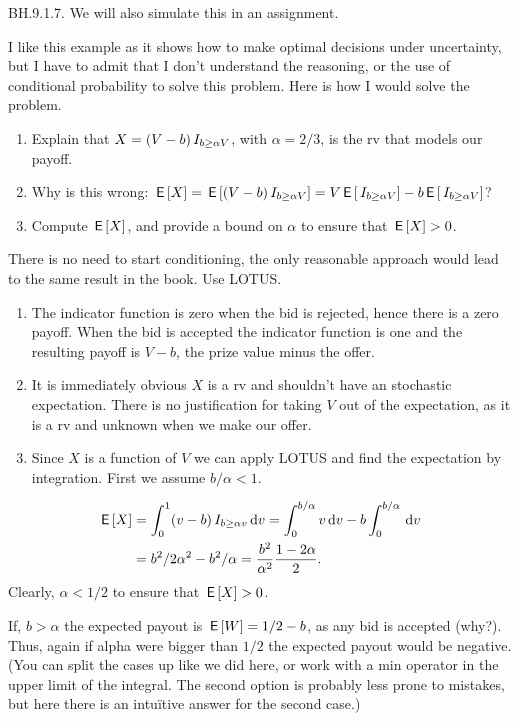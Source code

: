 \begin{exercise}
BH.9.1.7. We will also simulate this in an assignment.

I  like this example as it  shows how to make optimal decisions under uncertainty, but I have to admit that I don't understand the reasoning, or the use of conditional probability to solve this problem. Here is how I would solve the problem.
\begin{enumerate}
\item Explain that $X=(V-b)\,I_{b \geq \alpha V}$, with $\alpha=2/3$, is the rv that models our payoff.
\item Why is this wrong: $\,\mathsf{E}\left[X\right] = \,\mathsf{E}\left[(V-b)\,I_{b \geq \alpha V}\right] = V \,\mathsf{E}\left[\,I_{b \geq \alpha V}\right] -b \,\mathsf{E}\left[\,I_{b \geq \alpha V}\right]$?
\item Compute $\,\mathsf{E}\left[X\right]$, and provide a bound on $\alpha$ to ensure that $\,\mathsf{E}\left[X\right] > 0$.
\end{enumerate}
\begin{hint}
  There is no need to start conditioning, the only reasonable approach would lead to the same result in the book. Use LOTUS.
\end{hint}

\begin{solution}
\begin{enumerate}
  \item The indicator function is zero when the bid is rejected, hence there is a zero payoff. When the bid is accepted the indicator function is one and the resulting payoff is $V-b$, the prize value minus the offer.
  \item It is immediately obvious $X$ is a rv and shouldn't have an stochastic expectation. There is no justification for taking $V$ out of the expectation, as it is a rv and unknown when we make our offer.
  \item Since $X$ is a function of $V$ we can apply LOTUS and find the expectation by integration. First we assume $b/\alpha < 1$.
\end{enumerate}
\begin{align*}
\,\mathsf{E}\left[X\right] &= \int_0^1 (v-b) \,I_{b\geq \alpha v} \,\textrm{d}v = \int_0^{b/\alpha} v \,\textrm{d}v - b \int_0^{b/\alpha}  \,\textrm{d}v \\
  &= b^2/2\alpha^2 - b^2/\alpha = \frac{b^{2}}{\alpha^{2}} \frac{1-2\alpha}{2}.
\end{align*}
Clearly, $\alpha<1/2$ to ensure that $\,\mathsf{E}\left[X\right] > 0$.

If, $b>\alpha$ the expected payout is $\,\mathsf{E}\left[W\right] = 1/2 -b $, as any bid is accepted (why?). Thus, again if alpha were bigger than $1/2$ the expected payout would be negative.
(You can split the cases up like we did here, or work with a min operator in the upper limit of the integral. The second option is probably less prone to mistakes, but here there is an intu\"itive answer for the second case.)
\end{solution}
\end{exercise}

